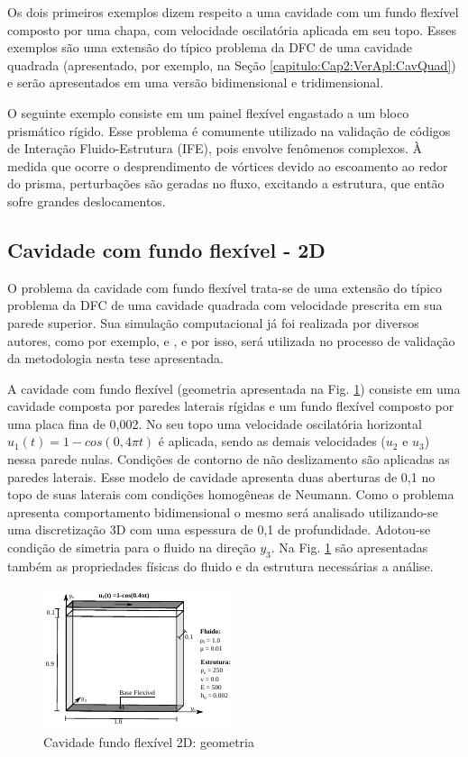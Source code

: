 \documentclass[tese_patricia]{subfiles}
\begin{document}
Os dois primeiros exemplos dizem respeito a uma cavidade com um fundo flexível composto por uma chapa, com velocidade oscilatória aplicada em seu topo. Esses exemplos são uma extensão do típico problema da DFC de uma cavidade quadrada (apresentado, por exemplo, na Seção \ref{capitulo:Cap2:VerApl:CavQuad}) e serão apresentados em uma versão bidimensional e tridimensional.

O seguinte exemplo consiste em um painel flexível engastado a um bloco prismático rígido. Esse problema é comumente utilizado na validação de códigos de Interação Fluido-Estrutura (IFE), pois envolve fenômenos complexos. À medida que ocorre o desprendimento de vórtices devido ao escoamento ao redor do prisma, perturbações são geradas no fluxo, excitando a estrutura, que então sofre grandes deslocamentos.

\subsection{Cavidade com fundo flexível - 2D}

O problema da cavidade com fundo flexível trata-se de uma extensão do típico problema da DFC de uma cavidade quadrada com velocidade prescrita em sua parede superior. Sua simulação computacional já foi realizada por diversos autores, como por exemplo,  e , e  por isso, será utilizada no processo de validação da metodologia nesta tese apresentada.

A cavidade com fundo flexível (geometria apresentada na Fig. \ref{fig:cavFF2d_geometria}) consiste em uma cavidade composta por paredes laterais rígidas e um fundo flexível composto por uma placa fina de 0,002. No seu topo uma velocidade oscilatória horizontal $u_1(t)=1-cos(0,4 \pi t)$ é aplicada, sendo as demais velocidades ($u_2$ e $u_3$) nessa parede nulas. Condições de contorno de não deslizamento são aplicadas as paredes laterais. Esse modelo de cavidade apresenta duas aberturas de 0,1 no topo de suas laterais com condições homogêneas de Neumann. Como o problema apresenta comportamento bidimensional o mesmo será analisado utilizando-se uma discretização 3D com uma espessura de 0,1 de profundidade. Adotou-se condição de simetria para o fluido na direção $y_3$.  Na Fig. \ref{fig:cavFF2d_geometria} são apresentadas também as propriedades físicas do fluido e da estrutura necessárias a análise.

\begin{figure}[htb!]
	\centering 
	\includegraphics[scale=2.0,trim=0cm 0cm 0cm 0cm, clip=true]{Imagens/Cap7/cavFF2d_geometria.pdf}	
	\caption{Cavidade fundo flexível 2D: geometria}
	\label{fig:cavFF2d_geometria}
\end{figure}
\end{document}

